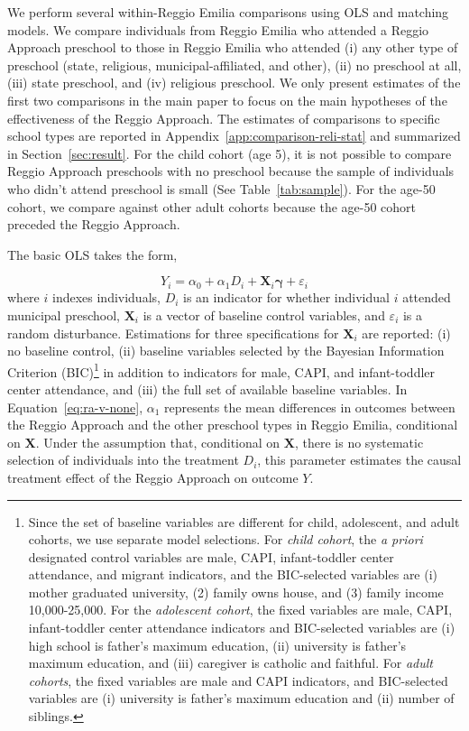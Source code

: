 We perform several within-Reggio Emilia comparisons using OLS and matching models. We compare individuals from Reggio Emilia who attended a Reggio Approach preschool to those in Reggio Emilia who attended (i) any other type of preschool (state, religious, municipal-affiliated, and other), (ii) no preschool at all, (iii) state preschool, and (iv) religious preschool. We only present estimates of the first two comparisons in the main paper to focus on the main hypotheses of the effectiveness of the Reggio Approach. The estimates of comparisons to specific school types are reported in Appendix~\ref{app:comparison-reli-stat} and summarized in Section~\ref{sec:result}. For the child cohort (age 5), it is not possible to compare Reggio Approach preschools with no preschool because the sample of individuals who didn't attend preschool is small (See Table~\ref{tab:sample}). For the age-50 cohort, we compare against other adult cohorts because the age-50 cohort preceded the Reggio Approach. 

The basic OLS takes the form,

\begin{equation}
	Y_i = \alpha_0 + \alpha_1 D_i + \bm{X}_i \bm{\gamma} + \varepsilon_i
	\label{eq:ra-v-none}
\end{equation}
where $i$ indexes individuals, $D_i$ is an indicator for whether individual $i$ attended municipal preschool, $\bm{X}_i$ is a vector of baseline control variables, and $\varepsilon_i$ is a random disturbance. Estimations for three specifications for $\bm{X}_i$ are reported: (i) no baseline control, (ii) baseline variables selected by the Bayesian Information Criterion (BIC)\footnote{Since the set of baseline variables are different for child, adolescent, and adult cohorts, we use separate model selections. For \emph{child cohort}, the \emph{a priori} designated control variables are male, CAPI, infant-toddler center attendance, and migrant indicators, and the BIC-selected variables are (i) mother graduated university, (2) family owns house, and (3) family income 10,000-25,000. For the \emph{adolescent cohort}, the fixed variables are male, CAPI, infant-toddler center attendance indicators and BIC-selected variables are (i) high school is father's maximum education, (ii) university is father's maximum education, and (iii) caregiver is catholic and faithful. For \emph{adult cohorts}, the fixed variables are male and CAPI indicators, and BIC-selected variables are (i) university is father's maximum education and (ii) number of siblings.} in addition to indicators for male, CAPI, and infant-toddler center attendance, and (iii) the full set of available baseline variables. In Equation~\eqref{eq:ra-v-none}, $\alpha_1$ represents the mean differences in outcomes between the Reggio Approach and the other preschool types in Reggio Emilia, conditional on $\bm{X}$. Under the assumption that, conditional on $\bm{X}$, there is no systematic selection of individuals into the treatment $D_i$, this parameter estimates the causal treatment effect of the Reggio Approach on outcome $Y$.

